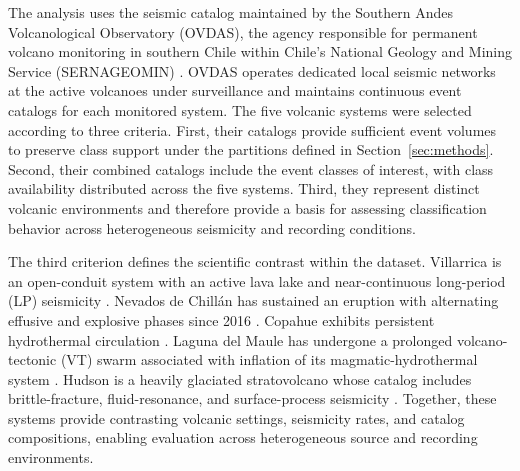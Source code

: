 \documentclass[pdflatex,sn-mathphys-num]{sn-jnl}
\begin{document}
The analysis uses the seismic catalog maintained by the Southern Andes
Volcanological Observatory (OVDAS), the agency responsible for permanent volcano
monitoring in southern Chile within Chile's National Geology and Mining Service
(SERNAGEOMIN) \cite{amigo_volcano_2021}. OVDAS operates dedicated local seismic
networks at the active volcanoes under surveillance and maintains continuous
event catalogs for each monitored system. The five volcanic systems were selected according to three criteria. First,
their catalogs provide sufficient event volumes to preserve class support
under the partitions defined in Section~\ref{sec:methods}. Second, their
combined catalogs include the event classes of interest, with class
availability distributed across the five systems. Third, they represent
distinct volcanic environments and therefore provide a basis for assessing
classification behavior across heterogeneous seismicity and recording
conditions.

The third criterion defines the scientific contrast within the dataset.
Villarrica is an open-conduit system with an active lava lake and
near-continuous long-period (LP) seismicity
\cite{richardson_varying_2014}. Nevados de Chill\'an has sustained an eruption
with alternating effusive and explosive phases since 2016
\cite{cardona_volcanic_2021}. Copahue exhibits persistent hydrothermal
circulation \cite{casas_single-station_2024}. Laguna del Maule has undergone a
prolonged volcano-tectonic (VT) swarm associated with inflation of its
magmatic-hydrothermal system \cite{cardona_crustal_2018}. Hudson is a heavily
glaciated stratovolcano whose catalog includes brittle-fracture, fluid-resonance,
and surface-process seismicity \cite{agurto-detzel_seismicity_2014}. Together, these systems provide contrasting volcanic settings, seismicity
rates, and catalog compositions, enabling evaluation across heterogeneous
source and recording environments.
\end{document}
